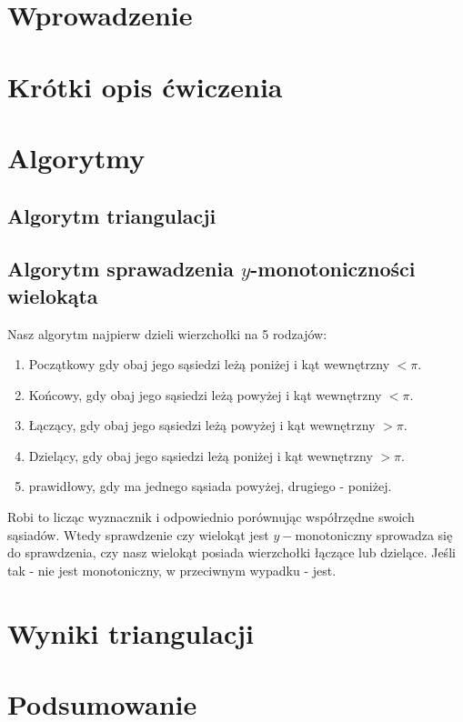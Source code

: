 \documentclass{sprawozdanie-agh}
\begin{document}

\stronatytulowa{}

\section{Wprowadzenie}


\section{Krótki opis ćwiczenia}


\section{Algorytmy}
\subsection{Algorytm triangulacji}

\subsection{Algorytm sprawadzenia $y$-monotoniczności wielokąta}
\quad Nasz algorytm najpierw dzieli wierzchołki na 5 rodzajów: 
\begin{enumerate}
    \item Początkowy gdy obaj jego sąsiedzi leżą
    poniżej i kąt wewnętrzny $< \pi$.
    \item Końcowy, gdy obaj jego sąsiedzi leżą
    powyżej i kąt wewnętrzny $< \pi$.
    \item Łączący, gdy obaj jego sąsiedzi leżą
    powyżej i kąt wewnętrzny $> \pi$.
    \item Dzielący, gdy obaj jego sąsiedzi leżą
    poniżej i kąt wewnętrzny $> \pi$.
    \item prawidłowy, gdy ma jednego sąsiada powyżej, drugiego - poniżej.
\end{enumerate}

Robi to licząc wyznacznik i odpowiednio porównując współrzędne swoich sąsiadów. 
Wtedy sprawdzenie czy wielokąt jest $y-$monotoniczny sprowadza się do sprawdzenia, czy nasz 
wielokąt posiada wierzchołki łączące lub dzielące. Jeśli tak - nie jest monotoniczny, w przeciwnym wypadku - jest.
\newpage
\section{Wyniki triangulacji}

\section{Podsumowanie}

\end{document}
